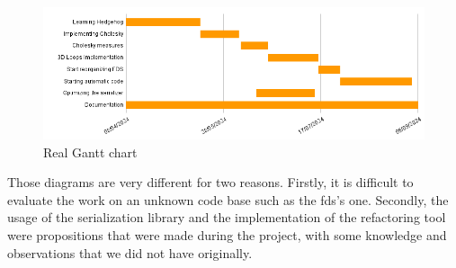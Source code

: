 \begin{figure}[h!]
  \begin{center}
    \includegraphics[scale=0.5]{img/real-gantt-chart.png}
    \caption{Real Gantt chart}
    \label{fig:realgantt}
  \end{center}
\end{figure}

Those diagrams are very different for two reasons. Firstly, it is difficult to
evaluate the work on an unknown code base such as the \gls{fds}'s one. Secondly,
the usage of the serialization library and the implementation of the refactoring
tool were propositions that were made during the project, with some knowledge
and observations that we did not have originally.
